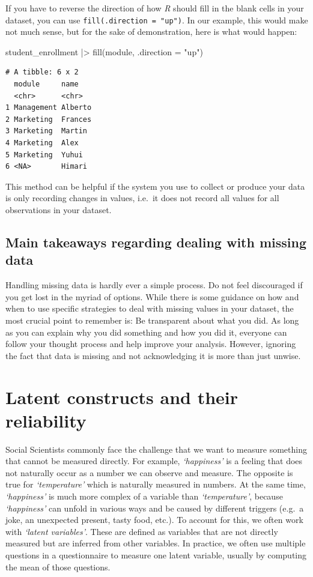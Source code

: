 \documentclass[
  letterpaper,
  DIV=11,
  numbers=noendperiod]{scrreprt}
\newenvironment{Shaded}{\begin{snugshade}}{\end{snugshade}}
\newcommand{\AttributeTok}[1]{\textcolor[rgb]{0.40,0.45,0.13}{#1}}
\newcommand{\FunctionTok}[1]{\textcolor[rgb]{0.28,0.35,0.67}{#1}}
\newcommand{\NormalTok}[1]{\textcolor[rgb]{0.00,0.23,0.31}{#1}}
\newcommand{\SpecialCharTok}[1]{\textcolor[rgb]{0.37,0.37,0.37}{#1}}
\newcommand{\StringTok}[1]{\textcolor[rgb]{0.13,0.47,0.30}{#1}}
\begin{document}
If you have to reverse the direction of how \emph{R} should fill in the
blank cells in your dataset, you can use
\texttt{fill(.direction\ =\ "up")}. In our example, this would make not
much sense, but for the sake of demonstration, here is what would
happen:

\begin{Shaded}
\begin{Highlighting}[]
\NormalTok{student\_enrollment }\SpecialCharTok{|\textgreater{}} \FunctionTok{fill}\NormalTok{(module, }\AttributeTok{.direction =} \StringTok{"up"}\NormalTok{)}
\end{Highlighting}
\end{Shaded}

\begin{verbatim}
# A tibble: 6 x 2
  module     name   
  <chr>      <chr>  
1 Management Alberto
2 Marketing  Frances
3 Marketing  Martin 
4 Marketing  Alex   
5 Marketing  Yuhui  
6 <NA>       Himari 
\end{verbatim}

This method can be helpful if the system you use to collect or produce
your data is only recording changes in values, i.e.~it does not record
all values for all observations in your dataset.

\subsection{Main takeaways regarding dealing with missing
data}\label{sec-main-takeaways-missing-data}

Handling missing data is hardly ever a simple process. Do not feel
discouraged if you get lost in the myriad of options. While there is
some guidance on how and when to use specific strategies to deal with
missing values in your dataset, the most crucial point to remember is:
Be transparent about what you did. As long as you can explain why you
did something and how you did it, everyone can follow your thought
process and help improve your analysis. However, ignoring the fact that
data is missing and not acknowledging it is more than just unwise.

\section{Latent constructs and their
reliability}\label{sec-latent-constructs}

Social Scientists commonly face the challenge that we want to measure
something that cannot be measured directly. For example,
\emph{`happiness'} is a feeling that does not naturally occur as a
number we can observe and measure. The opposite is true for
\emph{`temperature'} which is naturally measured in numbers. At the same
time, \emph{`happiness'} is much more complex of a variable than
\emph{`temperature'}, because \emph{`happiness'} can unfold in various
ways and be caused by different triggers (e.g.~a joke, an unexpected
present, tasty food, etc.). To account for this, we often work with
\emph{`latent variables'}. These are defined as variables that are not
directly measured but are inferred from other variables. In practice, we
often use multiple questions in a questionnaire to measure one latent
variable, usually by computing the mean of those questions.
\end{document}
